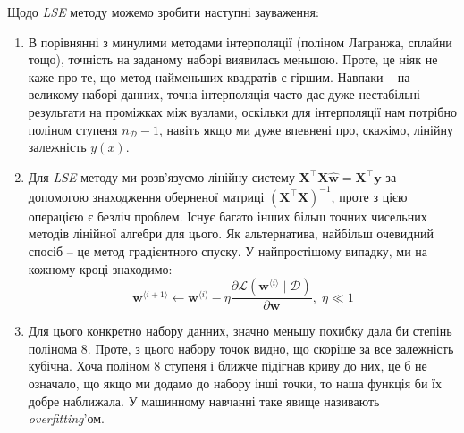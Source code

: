 \documentclass[12pt]{extarticle}
\begin{document}
Щодо \textit{LSE} методу можемо зробити наступні зауваження:
\begin{enumerate}
    \item В порівнянні з минулими методами інтерполяції (поліном Лагранжа, сплайни тощо), точність на заданому наборі виявилась меньшою. Проте, це ніяк не каже про те, що метод найменьших квадратів є гіршим. Навпаки -- на великому наборі данних, точна інтерполяція часто дає дуже нестабільні результати на проміжках між вузлами, оскільки для інтерполяції нам потрібно поліном ступеня $n_{\mathcal{D}}-1$, навіть якщо ми дуже впевнені про, скажімо, лінійну залежність $y(x)$.
    \item Для \textit{LSE} методу ми розв'язуємо лінійну систему $\mathbf{X}^{\top}\mathbf{X}\hat{\mathbf{w}} = \mathbf{X}^{\top} \mathbf{y}$ за допомогою знаходження оберненої матриці $(\mathbf{X}^{\top}\mathbf{X})^{-1}$, проте з цією операцією є безліч проблем. Існує багато інших більш точних чисельних методів лінійної алгебри для цього. Як альтернатива, найбільш очевидний спосіб -- це метод градієнтного спуску. У найпростішому випадку, ми на кожному кроці знаходимо:
    \[
    \mathbf{w}^{\langle i+1\rangle} \gets \mathbf{w}^{\langle i\rangle} - \eta \frac{\partial \mathcal{L}(\mathbf{w}^{\langle i \rangle} \mid \mathcal{D})}{\partial \mathbf{w}}, \; \eta \ll 1
    \]
    \item Для цього конкретно набору данних, значно меньшу похибку дала би степінь полінома $8$. Проте, з цього набору точок видно, що скоріше за все залежність кубічна. Хоча поліном $8$ ступеня і ближче підігнав криву до них, це б не означало, що якщо ми додамо до набору інші точки, то наша функція би їх добре наближала. У машинному навчанні таке явище називають \textit{overfitting}'ом. 
\end{enumerate}
\end{document}
